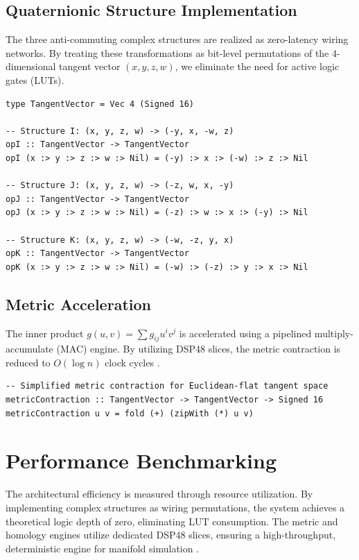 \documentclass[12pt, a4paper]{article}
\begin{document}
\subsection{Quaternionic Structure Implementation}
The three anti-commuting complex structures are realized as zero-latency wiring networks. By treating these transformations as bit-level permutations of the 4-dimensional tangent vector $(x, y, z, w)$, we eliminate the need for active logic gates (LUTs).

\begin{lstlisting}[caption=Complete Quaternionic Set in Clash]
type TangentVector = Vec 4 (Signed 16)

-- Structure I: (x, y, z, w) -> (-y, x, -w, z)
opI :: TangentVector -> TangentVector
opI (x :> y :> z :> w :> Nil) = (-y) :> x :> (-w) :> z :> Nil

-- Structure J: (x, y, z, w) -> (-z, w, x, -y)
opJ :: TangentVector -> TangentVector
opJ (x :> y :> z :> w :> Nil) = (-z) :> w :> x :> (-y) :> Nil

-- Structure K: (x, y, z, w) -> (-w, -z, y, x)
opK :: TangentVector -> TangentVector
opK (x :> y :> z :> w :> Nil) = (-w) :> (-z) :> y :> x :> Nil
\end{lstlisting}

\subsection{Metric Acceleration}
The inner product $g(u, v) = \sum g_{ij} u^i v^j$ is accelerated using a pipelined multiply-accumulate (MAC) engine. By utilizing DSP48 slices, the metric contraction is reduced to $O(\log n)$ clock cycles \cite{baas2021functional}.

\begin{lstlisting}[caption=Metric Contraction Logic]
-- Simplified metric contraction for Euclidean-flat tangent space
metricContraction :: TangentVector -> TangentVector -> Signed 16
metricContraction u v = fold (+) (zipWith (*) u v)
\end{lstlisting}

\section{Performance Benchmarking}
The architectural efficiency is measured through resource utilization. By implementing complex structures as wiring permutations, the system achieves a theoretical logic depth of zero, eliminating LUT consumption. The metric and homology engines utilize dedicated DSP48 slices, ensuring a high-throughput, deterministic engine for manifold simulation \cite{huybrechts2005complex}.



\end{document}
